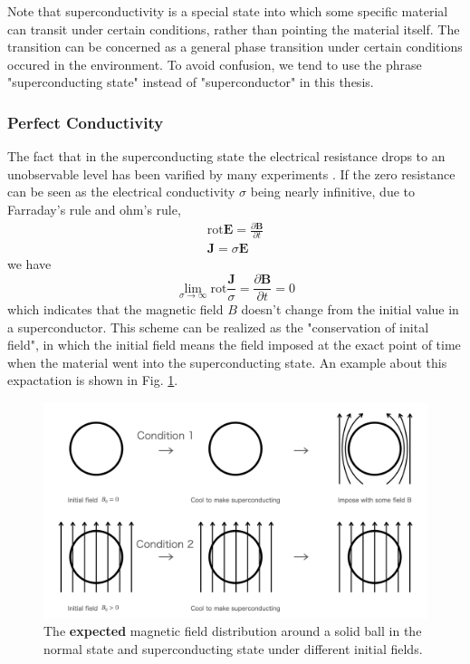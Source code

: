 Note that superconductivity is a special state into which some specific material can transit under certain conditions,
rather than pointing the material itself.
The transition can be concerned as a general phase transition under certain conditions occured in the environment.
To avoid confusion, we tend to use the phrase "superconducting state" instead of "superconductor" in this thesis.


\newpage
\subsubsection{Perfect Conductivity}
The fact that in the superconducting state the electrical resistance drops to an unobservable level has been varified by many experiments \cite{2_4}.
If the zero resistance can be seen as the electrical conductivity $\sigma$ being nearly infinitive,
due to Farraday's rule and ohm's rule,
\begin{eqnarray}
  \mathrm{rot}\bm{E} = \frac{\partial \bm{B}}{\partial t}\\
  \bm{J} = \sigma \bm{E}
\end{eqnarray}
we have
\begin{equation}
  \lim_{\sigma \to \infty} \mathrm{rot} \frac{\bm{J}}{\sigma} = \frac{\partial \bm{B}}{\partial t} = 0
\end{equation}
which indicates that the magnetic field $B$ doesn't change from the initial value in a superconductor.
This scheme can be realized as the "conservation of inital field",
in which the initial field means the field imposed at the exact point of time when the material went into the superconducting state.
An example about this expactation is shown in Fig. \ref{fig:perfectConductivity}.
\begin{figure}[H]
  \includegraphics[width=18.5cm, bb=9 9 900 500]{./section2Proposal/perfectConductivity.png}
  \caption{The {\bf expected} magnetic field distribution around a solid ball in the normal state and superconducting state under different initial fields. \cite{2_1}}
  \label{fig:perfectConductivity}
\end{figure}
